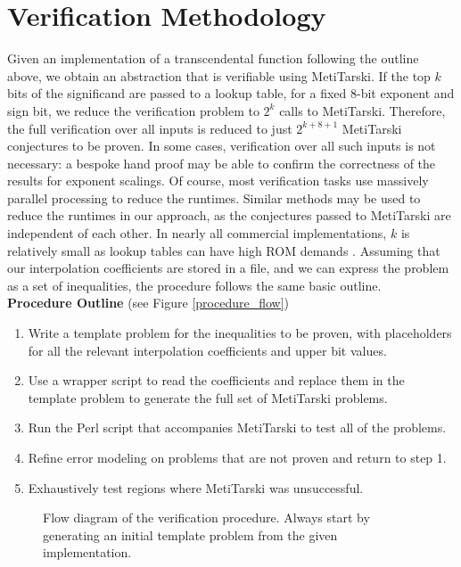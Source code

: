 \documentclass{fac}
\begin{document}
\section{Verification Methodology}
\label{Method}
Given an implementation of a transcendental function following the outline above, we obtain an abstraction that is verifiable using MetiTarski. If the top $k$ bits of the significand are passed to a lookup table, for a fixed 8-bit exponent and sign bit, we reduce the verification problem to $2^k$ calls to MetiTarski. Therefore, the  full verification over all inputs is reduced to 
just $2^{k+8+1}$ MetiTarski conjectures to be proven. In some cases, verification over all such inputs is not necessary: a bespoke hand proof may be able to confirm the correctness of the results for exponent scalings. Of course, most verification tasks use massively parallel processing to reduce the runtimes. Similar methods may be used to reduce the runtimes in our approach, as the conjectures passed to MetiTarski are independent of each other. In nearly all commercial implementations, $k$ is relatively small as lookup tables can have high ROM demands \cite{strollo2011elementary}. Assuming that our interpolation coefficients are stored in a file, and we can express the problem as a set of inequalities, the procedure follows the same basic outline. \\

\noindent\textbf{Procedure Outline} (see Figure \ref{procedure_flow})
\begin{enumerate}
\item Write a template problem for the inequalities to be proven, with placeholders for all the relevant interpolation coefficients and upper bit values.
\item Use a wrapper script to read the coefficients and replace them in the template problem to generate the full set of MetiTarski problems.
\item Run the Perl script that accompanies MetiTarski to test all of the problems.
\item Refine error modeling on problems that are not proven and return to step 1.
\item Exhaustively test regions where MetiTarski was unsuccessful.
\end{enumerate}  

\begin{figure} \label{procedure_flow}
\centering

\caption{Flow diagram of the verification procedure. Always start by generating an initial template problem from the given implementation. \label{procedure}}
\end{figure}
\end{document}
